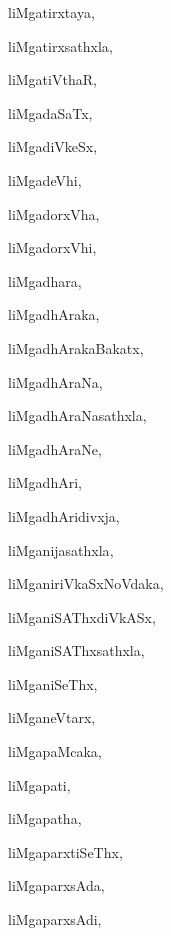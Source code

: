 \begin{multicols}{3}
{\noindent
{liMgatirxtaya}, \pageref{liMgatirxtaya}

\noindent
{liMgatirxsathxla}, \pageref{liMgatirxsathxla}

\noindent
{liMgatiVthaR}, \pageref{liMgatiVthaR}

\noindent
{liMgadaSaTx}, \pageref{liMgadaSaTx}

\noindent
{liMgadiVkeSx}, \pageref{liMgadiVkeSx}

\noindent
{liMgadeVhi}, \pageref{liMgadeVhi}

\noindent
{liMgadorxVha}, \pageref{liMgadorxVha}

\noindent
{liMgadorxVhi}, \pageref{liMgadorxVhi}

\noindent
{liMgadhara}, \pageref{liMgadhara}

\noindent
{liMgadhAraka}, \pageref{liMgadhAraka}

\noindent
{liMgadhArakaBakatx}, \pageref{liMgadhArakaBakatx}

\noindent
{liMgadhAraNa}, \pageref{liMgadhAraNa}

\noindent
{liMgadhAraNasathxla}, \pageref{liMgadhAraNasathxla}

\noindent
{liMgadhAraNe}, \pageref{liMgadhAraNe}

\noindent
{liMgadhAri}, \pageref{liMgadhAri}

\noindent
{liMgadhAridivxja}, \pageref{liMgadhAridivxja}

\noindent
{liMganijasathxla}, \pageref{liMganijasathxla}

\noindent
{liMganiriVkaSxNoVdaka}, \pageref{liMganiriVkaSxNoVdaka}

\noindent
{liMganiSAThxdiVkASx}, \pageref{liMganiSAThxdiVkASx}

\noindent
{liMganiSAThxsathxla}, \pageref{liMganiSAThxsathxla}

\noindent
{liMganiSeThx}, \pageref{liMganiSeThx}

\noindent
{liMganeVtarx}, \pageref{liMganeVtarx}

\noindent
{liMgapaMcaka}, \pageref{liMgapaMcaka}

\noindent
{liMgapati}, \pageref{liMgapati}

\noindent
{liMgapatha}, \pageref{liMgapatha}

\noindent
{liMgaparxtiSeThx}, \pageref{liMgaparxtiSeThx}

\noindent
{liMgaparxsAda}, \pageref{liMgaparxsAda}

\noindent
{liMgaparxsAdi}, \pageref{liMgaparxsAdi}

}
\end{multicols}

